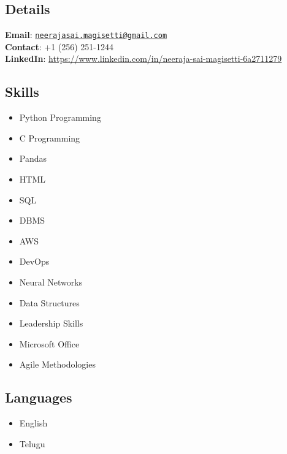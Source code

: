 \documentclass[
  16,
]{article}
\providecommand{\tightlist}{%
  \setlength{\itemsep}{0pt}\setlength{\parskip}{0pt}}\usepackage{longtable,booktabs,array}
\begin{document}
\subsection{Details}\label{details}

\textbf{Email}:
\href{mailto:neerajasai.magisetti@gmail.com}{\nolinkurl{neerajasai.magisetti@gmail.com}}\\
\textbf{Contact}: +1 (256) 251-1244\\
\textbf{LinkedIn}:
\url{https://www.linkedin.com/in/neeraja-sai-magisetti-6a2711279}

\subsection{Skills}\label{skills}

\begin{itemize}
\tightlist
\item
  Python Programming
\item
  C Programming
\item
  Pandas
\item
  HTML
\item
  SQL
\item
  DBMS
\item
  AWS
\item
  DevOps
\item
  Neural Networks
\item
  Data Structures
\item
  Leadership Skills
\item
  Microsoft Office
\item
  Agile Methodologies
\end{itemize}

\subsection{Languages}\label{languages}

\begin{itemize}
\tightlist
\item
  English
\item
  Telugu
\end{itemize}
\end{document}
